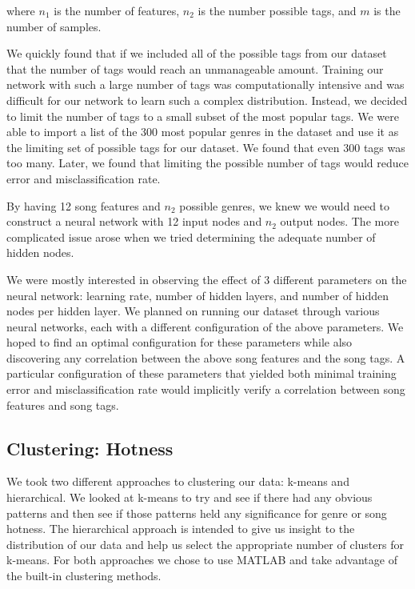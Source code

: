 \documentclass[12pt]{article}
\begin{document}
where $n_1$ is the number of features, $n_2$ is the number possible tags, and $m$ is the number of samples.

We quickly found that if we included all of the possible tags from our dataset that the number of tags would reach an unmanageable amount. Training our network with such a large number of tags was computationally intensive and was difficult for our network to learn such a complex distribution. Instead, we decided to limit the number of tags to a small subset of the most popular tags. We were able to import a list of the 300 most popular genres in the dataset and use it as the limiting set of possible tags for our dataset. We found that even 300 tags was too many. Later, we found that limiting the possible number of tags would reduce error and misclassification rate.

By having 12 song features and $n_2$ possible genres, we knew we would need to construct a neural network with 12 input nodes and $n_2$ output nodes. The more complicated issue arose when we tried determining the adequate number of hidden nodes.

We were mostly interested in observing the effect of 3 different parameters on the neural network: learning rate, number of hidden layers, and number of hidden nodes per hidden layer. We planned on running our dataset through various neural networks, each with a different configuration of the above parameters. We hoped to find an optimal configuration for these parameters while also discovering any correlation between the above song features and the song tags. A particular configuration of these parameters that yielded both minimal training error and misclassification rate would implicitly verify a correlation between song features and song tags.

\subsection{Clustering: Hotness}
\label{subsec:clustering}
We took two different approaches to clustering our data: k-means and hierarchical. We looked at k-means to try and see if there had any obvious patterns and then see if those patterns held any significance for genre or song hotness. The hierarchical approach is intended to give us insight to the distribution of our data and help us select the appropriate number of clusters for k-means. For both approaches we chose to use MATLAB and take advantage of the built-in clustering methods.
\end{document}
